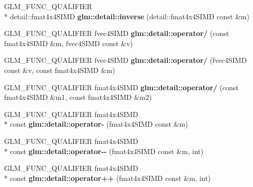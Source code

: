 \begin{DoxyCompactItemize}
\item 
\hypertarget{namespaceglm_1_1detail_a4d5c895b3548f6c8296fd6a9980fe3e1}{G\-L\-M\-\_\-\-F\-U\-N\-C\-\_\-\-Q\-U\-A\-L\-I\-F\-I\-E\-R \\*
detail\-::fmat4x4\-S\-I\-M\-D {\bfseries glm\-::detail\-::inverse} (detail\-::fmat4x4\-S\-I\-M\-D const \&m)}\label{namespaceglm_1_1detail_a4d5c895b3548f6c8296fd6a9980fe3e1}

\item 
\hypertarget{namespaceglm_1_1detail_a9041c53e82c0b0191b24185e14e2b55f}{G\-L\-M\-\_\-\-F\-U\-N\-C\-\_\-\-Q\-U\-A\-L\-I\-F\-I\-E\-R fvec4\-S\-I\-M\-D {\bfseries glm\-::detail\-::operator/} (const fmat4x4\-S\-I\-M\-D \&m, fvec4\-S\-I\-M\-D const \&v)}\label{namespaceglm_1_1detail_a9041c53e82c0b0191b24185e14e2b55f}

\item 
\hypertarget{namespaceglm_1_1detail_a147045f9002e1195039f968a2396c435}{G\-L\-M\-\_\-\-F\-U\-N\-C\-\_\-\-Q\-U\-A\-L\-I\-F\-I\-E\-R fvec4\-S\-I\-M\-D {\bfseries glm\-::detail\-::operator/} (fvec4\-S\-I\-M\-D const \&v, const fmat4x4\-S\-I\-M\-D \&m)}\label{namespaceglm_1_1detail_a147045f9002e1195039f968a2396c435}

\item 
\hypertarget{namespaceglm_1_1detail_ace681b03cfb7d72e2633dc06d4cee962}{G\-L\-M\-\_\-\-F\-U\-N\-C\-\_\-\-Q\-U\-A\-L\-I\-F\-I\-E\-R fmat4x4\-S\-I\-M\-D {\bfseries glm\-::detail\-::operator/} (const fmat4x4\-S\-I\-M\-D \&m1, const fmat4x4\-S\-I\-M\-D \&m2)}\label{namespaceglm_1_1detail_ace681b03cfb7d72e2633dc06d4cee962}

\item 
\hypertarget{namespaceglm_1_1detail_a7f0cc16af5799679034230c9cea81b10}{G\-L\-M\-\_\-\-F\-U\-N\-C\-\_\-\-Q\-U\-A\-L\-I\-F\-I\-E\-R fmat4x4\-S\-I\-M\-D \\*
const {\bfseries glm\-::detail\-::operator-\/} (fmat4x4\-S\-I\-M\-D const \&m)}\label{namespaceglm_1_1detail_a7f0cc16af5799679034230c9cea81b10}

\item 
\hypertarget{namespaceglm_1_1detail_a37b1c3ee6bcd2c5e56d49e2ea90f4ee5}{G\-L\-M\-\_\-\-F\-U\-N\-C\-\_\-\-Q\-U\-A\-L\-I\-F\-I\-E\-R fmat4x4\-S\-I\-M\-D \\*
const {\bfseries glm\-::detail\-::operator-\/-\/} (fmat4x4\-S\-I\-M\-D const \&m, int)}\label{namespaceglm_1_1detail_a37b1c3ee6bcd2c5e56d49e2ea90f4ee5}

\item 
\hypertarget{namespaceglm_1_1detail_afef703ea9bc24f3b3abbcc36e5ef65bb}{G\-L\-M\-\_\-\-F\-U\-N\-C\-\_\-\-Q\-U\-A\-L\-I\-F\-I\-E\-R fmat4x4\-S\-I\-M\-D \\*
const {\bfseries glm\-::detail\-::operator++} (fmat4x4\-S\-I\-M\-D const \&m, int)}\label{namespaceglm_1_1detail_afef703ea9bc24f3b3abbcc36e5ef65bb}


\end{DoxyCompactItemize}

